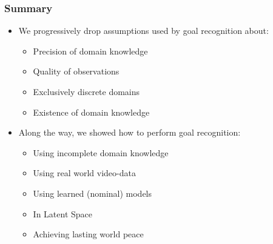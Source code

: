 \documentclass[usenames,dvipsnames]{beamer}
\begin{document}
\begin{frame}[c]\frametitle{Summary}
	\begin{itemize}
		\item We progressively drop assumptions used by goal recognition about:
		\begin{itemize}
			\item<1-> Precision of domain knowledge
			\item<2-> Quality of observations
			\item<3-> Exclusively discrete domains
			\item<4-> Existence of domain knowledge
		\end{itemize}
		\item Along the way, we showed how to perform goal recognition:
		\begin{itemize}
			\item<1-> Using incomplete domain knowledge
			\item<2-> Using real world video-data
			\item<3-> Using learned (nominal) models
			\item<4-> In Latent Space
			\item<5-> Achieving lasting world peace \onslide<6->{\color{red}(Ok, maybe not)}
		\end{itemize}
	\end{itemize}
\end{frame}
\end{document}
